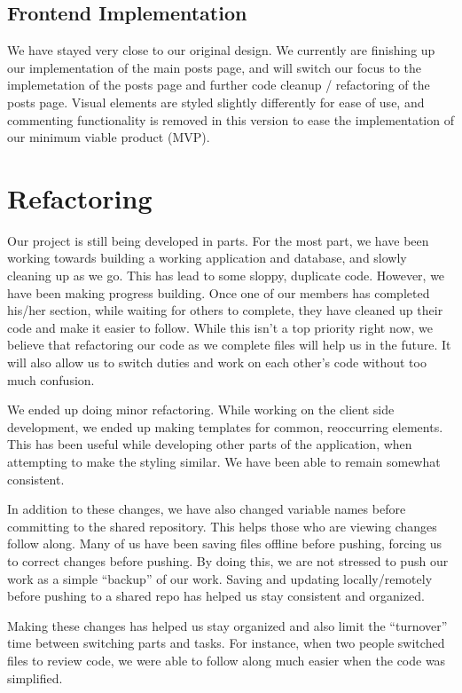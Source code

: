 \documentclass[12pt]{article}
\begin{document}
\subsection{Frontend Implementation}
We have stayed very close to our original design. We currently are finishing up
our implementation of the main posts page, and will switch our focus to the
implemetation of the posts page and further code cleanup / refactoring of the
posts page. Visual elements are styled slightly differently for ease of use, and
commenting functionality is removed in this version to ease the implementation
of our minimum viable product (MVP).

\section{Refactoring}

Our project is still being developed in parts. For the most part, we have
been working towards building a working application and database, and slowly
cleaning up as we go. This has lead to some sloppy, duplicate code. However,
we have been making progress building. Once one of our members has completed
his/her section, while waiting for others to complete, they have cleaned up
their code and make it easier to follow. While this isn’t a top priority
right now, we believe that refactoring our code as we complete files will
help us in the future. It will also allow us to switch duties and work on
each other's code without too much confusion.

We ended up doing minor refactoring. While working on the client side
development, we ended up making templates for common, reoccurring elements.
This has been useful while developing other parts of the application, when
attempting to make the styling similar. We have been able to remain somewhat
consistent.

In addition to these changes, we have also changed variable names before
committing to the shared repository. This helps those who are viewing
changes follow along. Many of us have been saving files offline before
pushing, forcing us to correct changes before pushing. By doing this, we are
not stressed to push our work as a simple “backup” of our work. Saving and
updating locally/remotely before pushing to a shared repo has helped us stay
consistent and organized.

Making these changes has helped us stay organized and also limit the
“turnover” time between switching parts and tasks. For instance, when two
people switched files to review code, we were able to follow along much
easier when the code was simplified.
\end{document}

